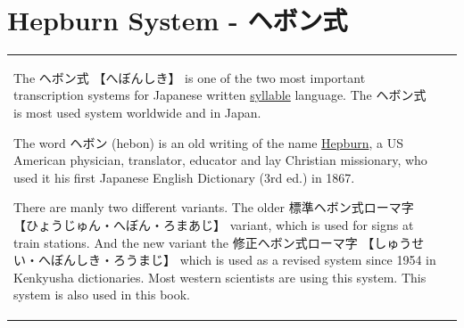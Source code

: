 \section{Hepburn System - ヘボン式} \label{sec:Hepburn}

\begin{tabular}{lr}
\begin{minipage}{11cm}

The { ヘボン式} {【へぼんしき】} is one of the two most important transcription
systems for Japanese written \hyperref[sec:Syllable]{syllable} language. The
{ヘボン式} is most used system worldwide and in Japan.

The word {ヘボン} (hebon) is an old writing of the name
\href{http://en.wikipedia.org/wiki/James_Curtis_Hepburn}{Hepburn}, a US
American  physician, translator, educator and lay Christian missionary, who
used it his first Japanese English Dictionary (3rd ed.) in 1867.

There are manly two different variants. The older {標準ヘボン式ローマ字}
{【ひょうじゅん・へぼん・ろまあじ】} variant, which is used for signs at train
stations. And the new variant the {修正ヘボン式ローマ字}
{【しゅうせい・へぼんしき・ろうまじ】} which is used as a revised system since 1954
in Kenkyusha dictionaries. Most western scientists are using this system. This
system is also used in this book.


\end{minipage}
\end{tabular}
